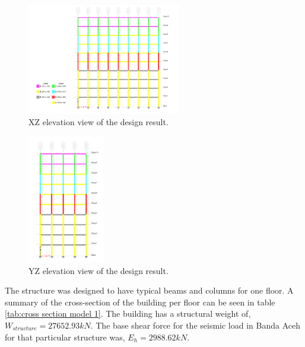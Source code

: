 \documentclass{cup-pan}
\begin{document}
\begin{figure}[H]
\centering
\includegraphics[width=0.6\textwidth]{Picture6.png}
\caption{XZ elevation view of the design result.}
\label{fig:XZ view}
\end{figure}

\begin{figure}[H]
\centering
\includegraphics[width=0.3\textwidth]{Picture7.png}
\caption{YZ elevation view of the design result.}
\label{fig:YZ view}
\end{figure}

The structure was designed to have typical beams and columns for one floor. A summary of the cross-section of the building per floor can be seen in table \ref{tab:cross section model 1}. The building has a structural weight of, $W_{structure}=\num{27652,93} \si{kN}$. The base shear force for the seismic load in Banda Aceh for that particular structure was, $E_h=\num{2988,62} \si{kN}$.
\end{document}

